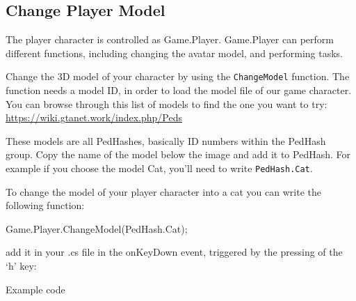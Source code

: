 \documentclass[
  openany]{book}
\newenvironment{Shaded}{\begin{snugshade}}{\end{snugshade}}
\newcommand{\FunctionTok}[1]{\textcolor[rgb]{0.00,0.00,0.00}{#1}}
\newcommand{\NormalTok}[1]{#1}
\begin{document}
\hypertarget{change-player-model}{%
\subsection*{Change Player Model}\label{change-player-model}}

The player character is controlled as Game.Player. Game.Player can perform different functions, including changing the avatar model, and performing tasks.

Change the 3D model of your character by using the \texttt{ChangeModel} function.
The function needs a model ID, in order to load the model file of our game character.
You can browse through this list of models to find the one you want to try: \url{https://wiki.gtanet.work/index.php/Peds}

These models are all PedHashes, basically ID numbers within the PedHash group. Copy the name of the model below the image and add it to PedHash.
For example if you choose the model Cat, you'll need to write \texttt{PedHash.Cat}.

To change the model of your player character into a cat you can write the following function:

\begin{Shaded}
\begin{Highlighting}[]
\NormalTok{Game.}\FunctionTok{Player}\NormalTok{.}\FunctionTok{ChangeModel}\NormalTok{(PedHash.}\FunctionTok{Cat}\NormalTok{);}
\end{Highlighting}
\end{Shaded}

add it in your .cs file in the onKeyDown event, triggered by the pressing of the `h' key:

Example code
\end{document}

